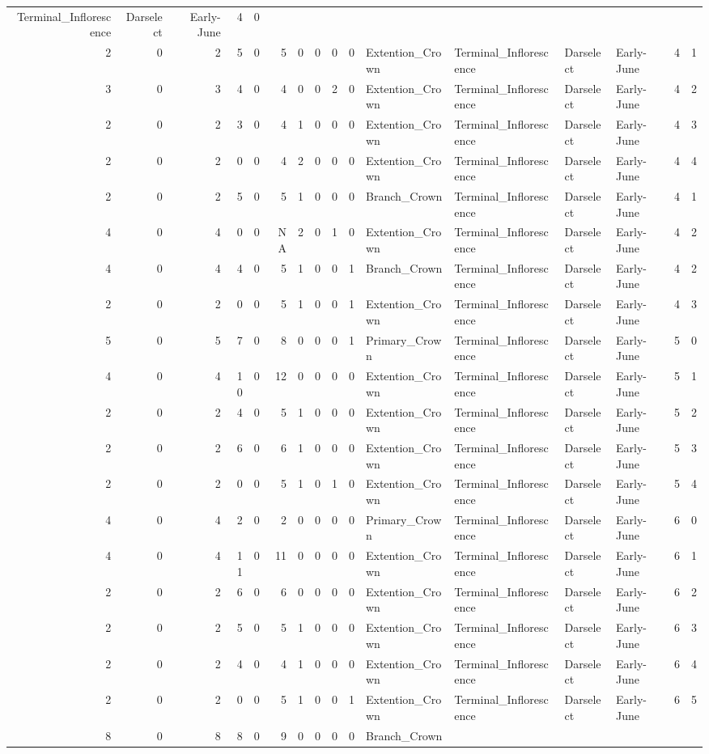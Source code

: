 \documentclass[]{article}
\begin{document}
\begin{longtable}[]{@{}rrrrrrrrrrllllrl@{}}
Terminal\_Inflorescence & Darselect & Early-June & 4 & 0\tabularnewline
2 & 0 & 2 & 5 & 0 & 5 & 0 & 0 & 0 & 0 & Extention\_Crown &
Terminal\_Inflorescence & Darselect & Early-June & 4 & 1\tabularnewline
3 & 0 & 3 & 4 & 0 & 4 & 0 & 0 & 2 & 0 & Extention\_Crown &
Terminal\_Inflorescence & Darselect & Early-June & 4 & 2\tabularnewline
2 & 0 & 2 & 3 & 0 & 4 & 1 & 0 & 0 & 0 & Extention\_Crown &
Terminal\_Inflorescence & Darselect & Early-June & 4 & 3\tabularnewline
2 & 0 & 2 & 0 & 0 & 4 & 2 & 0 & 0 & 0 & Extention\_Crown &
Terminal\_Inflorescence & Darselect & Early-June & 4 & 4\tabularnewline
2 & 0 & 2 & 5 & 0 & 5 & 1 & 0 & 0 & 0 & Branch\_Crown &
Terminal\_Inflorescence & Darselect & Early-June & 4 & 1\tabularnewline
4 & 0 & 4 & 0 & 0 & NA & 2 & 0 & 1 & 0 & Extention\_Crown &
Terminal\_Inflorescence & Darselect & Early-June & 4 & 2\tabularnewline
4 & 0 & 4 & 4 & 0 & 5 & 1 & 0 & 0 & 1 & Branch\_Crown &
Terminal\_Inflorescence & Darselect & Early-June & 4 & 2\tabularnewline
2 & 0 & 2 & 0 & 0 & 5 & 1 & 0 & 0 & 1 & Extention\_Crown &
Terminal\_Inflorescence & Darselect & Early-June & 4 & 3\tabularnewline
5 & 0 & 5 & 7 & 0 & 8 & 0 & 0 & 0 & 1 & Primary\_Crown &
Terminal\_Inflorescence & Darselect & Early-June & 5 & 0\tabularnewline
4 & 0 & 4 & 10 & 0 & 12 & 0 & 0 & 0 & 0 & Extention\_Crown &
Terminal\_Inflorescence & Darselect & Early-June & 5 & 1\tabularnewline
2 & 0 & 2 & 4 & 0 & 5 & 1 & 0 & 0 & 0 & Extention\_Crown &
Terminal\_Inflorescence & Darselect & Early-June & 5 & 2\tabularnewline
2 & 0 & 2 & 6 & 0 & 6 & 1 & 0 & 0 & 0 & Extention\_Crown &
Terminal\_Inflorescence & Darselect & Early-June & 5 & 3\tabularnewline
2 & 0 & 2 & 0 & 0 & 5 & 1 & 0 & 1 & 0 & Extention\_Crown &
Terminal\_Inflorescence & Darselect & Early-June & 5 & 4\tabularnewline
4 & 0 & 4 & 2 & 0 & 2 & 0 & 0 & 0 & 0 & Primary\_Crown &
Terminal\_Inflorescence & Darselect & Early-June & 6 & 0\tabularnewline
4 & 0 & 4 & 11 & 0 & 11 & 0 & 0 & 0 & 0 & Extention\_Crown &
Terminal\_Inflorescence & Darselect & Early-June & 6 & 1\tabularnewline
2 & 0 & 2 & 6 & 0 & 6 & 0 & 0 & 0 & 0 & Extention\_Crown &
Terminal\_Inflorescence & Darselect & Early-June & 6 & 2\tabularnewline
2 & 0 & 2 & 5 & 0 & 5 & 1 & 0 & 0 & 0 & Extention\_Crown &
Terminal\_Inflorescence & Darselect & Early-June & 6 & 3\tabularnewline
2 & 0 & 2 & 4 & 0 & 4 & 1 & 0 & 0 & 0 & Extention\_Crown &
Terminal\_Inflorescence & Darselect & Early-June & 6 & 4\tabularnewline
2 & 0 & 2 & 0 & 0 & 5 & 1 & 0 & 0 & 1 & Extention\_Crown &
Terminal\_Inflorescence & Darselect & Early-June & 6 & 5\tabularnewline
8 & 0 & 8 & 8 & 0 & 9 & 0 & 0 & 0 & 0 & Branch\_Crown &

\end{longtable}
\end{document}
